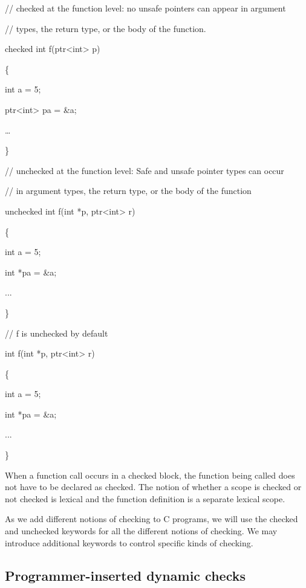 \documentclass[]{article}
\begin{document}
// checked at the function level: no unsafe pointers can appear in
argument

// types, the return type, or the body of the function.

checked int f(ptr\textless{}int\textgreater{} p)

\{

int a = 5;

ptr\textless{}int\textgreater{} pa = \&a;

\ldots{}

\}

// unchecked at the function level: Safe and unsafe pointer types can
occur

// in argument types, the return type, or the body of the function

unchecked int f(int *p, ptr\textless{}int\textgreater{} r)

\{

int a = 5;

int *pa = \&a;

...

\}

// f is unchecked by default

int f(int *p, ptr\textless{}int\textgreater{} r)

\{

int a = 5;

int *pa = \&a;

...

\}

When a function call occurs in a checked block, the function being
called does not have to be declared as checked. The notion of whether a
scope is checked or not checked is lexical and the function definition
is a separate lexical scope.

As we add different notions of checking to C programs, we will use the
checked and unchecked keywords for all the different notions of
checking. We may introduce additional keywords to control specific kinds
of checking.

\subsection{\texorpdfstring{\protect\hypertarget{ux5fToc440445423}{}{\protect\hypertarget{ux5fToc440449205}{}{\protect\hypertarget{ux5fToc440551855}{}{\protect\hypertarget{ux5fRef425152176}{}{\protect\hypertarget{ux5fToc426641065}{}{\protect\hypertarget{ux5fToc435434925}{}{\protect\hypertarget{ux5fToc437460746}{}{\protect\hypertarget{ux5fRef417383106}{}{\protect\hypertarget{ux5fToc420589174}{}{\protect\hypertarget{ux5fToc422906964}{}{\protect\hypertarget{ux5fToc424307689}{}{\protect\hypertarget{ux5fRef424921786}{}{\protect\hypertarget{ux5fRef426460472}{}{\protect\hypertarget{ux5fToc426641066}{}{\protect\hypertarget{ux5fRef426706500}{}{\protect\hypertarget{ux5fRef426707489}{}{\protect\hypertarget{ux5fRef435098164}{}{}}}}}}}}}}}}}}}}}Programmer-inserted
dynamic
checks}{Programmer-inserted dynamic checks}}\label{programmer-inserted-dynamic-checks}
\end{document}
